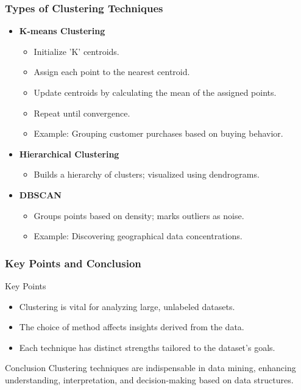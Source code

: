 \documentclass[aspectratio=169]{beamer}
\begin{document}
\begin{frame}[fragile]
    \frametitle{Types of Clustering Techniques}
    \begin{itemize}
        \item \textbf{K-means Clustering}
        \begin{itemize}
            \item Initialize 'K' centroids.
            \item Assign each point to the nearest centroid.
            \item Update centroids by calculating the mean of the assigned points.
            \item Repeat until convergence.
            \item Example: Grouping customer purchases based on buying behavior.
        \end{itemize}
        
        \item \textbf{Hierarchical Clustering}
        \begin{itemize}
            \item Builds a hierarchy of clusters; visualized using dendrograms.
        \end{itemize}
        
        \item \textbf{DBSCAN}
        \begin{itemize}
            \item Groups points based on density; marks outliers as noise.
            \item Example: Discovering geographical data concentrations.
        \end{itemize}
    \end{itemize}
\end{frame}

\begin{frame}[fragile]
    \frametitle{Key Points and Conclusion}
    \begin{block}{Key Points}
        \begin{itemize}
            \item Clustering is vital for analyzing large, unlabeled datasets.
            \item The choice of method affects insights derived from the data.
            \item Each technique has distinct strengths tailored to the dataset's goals.
        \end{itemize}
    \end{block}
    \begin{block}{Conclusion}
        Clustering techniques are indispensable in data mining, enhancing understanding, interpretation, and decision-making based on data structures.
    \end{block}
\end{frame}
\end{document}
